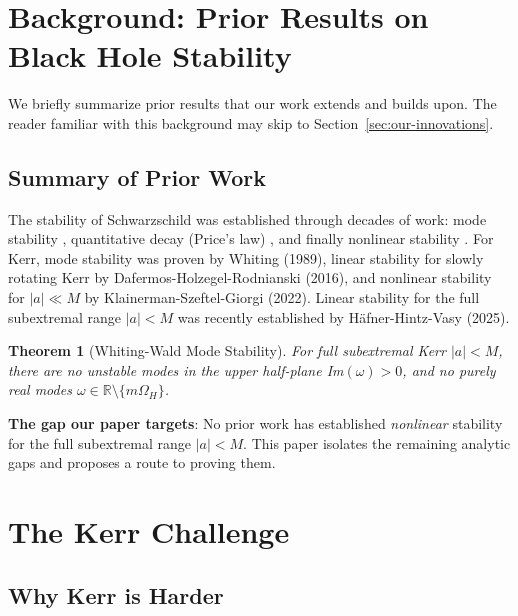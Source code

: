\documentclass[12pt,a4paper]{article}
\newtheorem{theorem}{Theorem}[section]
\begin{document}
\section{Background: Prior Results on Black Hole Stability}

We briefly summarize prior results that our work extends and builds upon. The reader familiar with this background may skip to Section~\ref{sec:our-innovations}.

\subsection{Summary of Prior Work}

The stability of Schwarzschild was established through decades of work: mode stability \cite{whiting1989}, quantitative decay (Price's law) \cite{dafermos2005}, and finally nonlinear stability \cite{DHRT2021}. For Kerr, mode stability was proven by Whiting (1989), linear stability for slowly rotating Kerr by Dafermos-Holzegel-Rodnianski (2016), and nonlinear stability for $|a| \ll M$ by Klainerman-Szeftel-Giorgi (2022). Linear stability for the full subextremal range $|a| < M$ was recently established by Häfner-Hintz-Vasy (2025).

\begin{theorem}[Whiting-Wald Mode Stability]\label{thm:whiting-wald}
For full subextremal Kerr $|a| < M$, there are no unstable modes in the upper half-plane Im$(\omega) > 0$, and no purely real modes $\omega \in \mathbb{R} \setminus \{m\Omega_H\}$.
\end{theorem}

\textbf{The gap our paper targets}: No prior work has established \textit{nonlinear} stability for the full subextremal range $|a| < M$. This paper isolates the remaining analytic gaps and proposes a route to proving them.

\section{The Kerr Challenge}

\subsection{Why Kerr is Harder}
\end{document}
